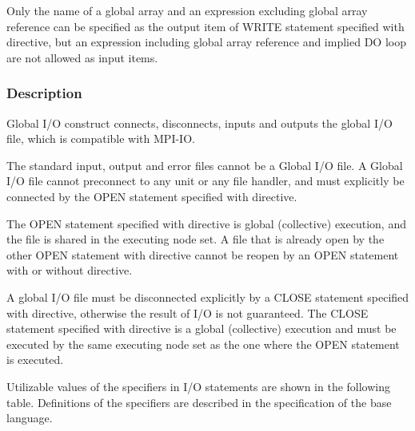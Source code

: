    Only the name of a global array and an
   expression excluding global array reference can be specified as the output item
   of WRITE statement specified with \gio directive, 
   but an expression including global array
   reference and implied DO loop are not allowed as input items.

   \subsubsection*{Description}

   Global I/O construct connects, disconnects, inputs and outputs the global I/O file,
   which is compatible with MPI-IO.

   The standard input, output and error files cannot be a Global I/O file.
   A Global I/O file cannot preconnect to any unit or any file handler,
   and must explicitly be connected by the OPEN statement specified with
   \gio directive.

   The OPEN statement specified with \gio directive is global
   (collective) execution, and the file is shared in the executing node
   set.
   A file that is already open by the other OPEN statement with
   \gio directive cannot be reopen by an OPEN statement with or
   without \gio directive.

   A global I/O file must be disconnected explicitly by a CLOSE
   statement specified with \gio directive, otherwise the result of I/O
   is not guaranteed.
   The CLOSE statement specified with \gio directive is a global
   (collective) execution and must be executed by the same executing
   node set as the one where the OPEN statement is executed.

   Utilizable values of the specifiers in I/O statements are shown in the
   following table.
   Definitions of the specifiers are described in the specification of
   the base language.

